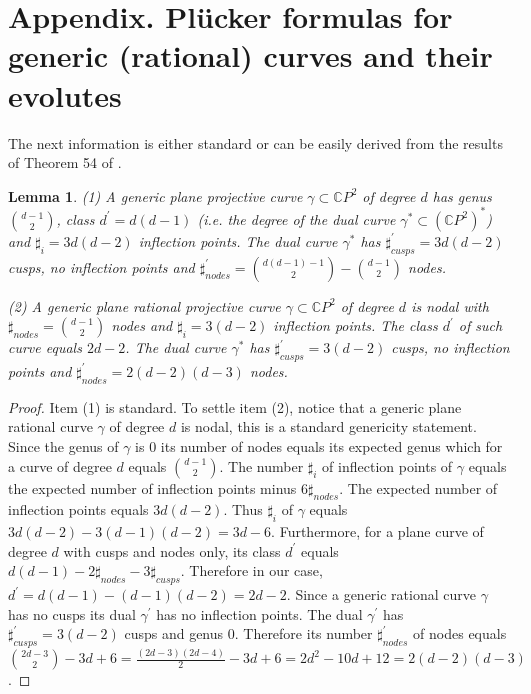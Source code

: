 \documentclass[reqno]{amsart}
\newtheorem{lemma}[theorem]{Lemma}
\newcommand{\bC}{\mathbb{C}}
\newcommand {\ga}{\gamma}
\theoremstyle{definition}
\theoremstyle{remark}
\theoremstyle{definition}
\theoremstyle{definition}
\theoremstyle{definition}
\begin{document}
\section{Appendix. Pl\"ucker formulas for generic (rational) curves and their evolutes}

The next information is either standard or can be easily derived from the results of Theorem 54 of  \cite{Coo}.

\begin{lemma}\label{lm:rat}  {\rm (1)} A generic plane projective curve $\ga\subset \bC P^2$ of degree $d$ has genus $\binom {d-1}{2}$, class  $d^\prime= d(d-1)$ (i.e. the degree of the dual curve $\ga^\ast\subset (\bC P^2)^\ast$) and  $\sharp_i=3d(d-2)$ inflection points.  The dual curve $\ga^\ast$ has $\sharp^\prime_{cusps}=3d(d-2)$ cusps, no inflection points and $\sharp^\prime_{nodes}=\binom{d(d-1)-1}{2}-\binom{d-1}{2}$ nodes.

\noindent
{\rm (2)} A generic plane rational projective curve $\ga\subset \bC P^2$ of degree $d$ is nodal with $\sharp_{nodes}=\binom{d-1}{2}$ nodes and $\sharp_i=3(d-2)$ inflection points. The class $d^\prime$ of such curve  equals $2d-2$. The dual curve $\ga^\ast$ has $\sharp^\prime_{cusps}=3(d-2)$ cusps, no inflection points and $\sharp^\prime_{nodes}=2(d-2)(d-3)$ nodes.
\end{lemma}

\begin{proof} Item (1) is standard. To settle item (2), notice that a generic plane rational curve $\gamma$ of degree $d$ is nodal, this is a standard genericity statement. Since the genus of $\gamma$ is $0$ its number of nodes equals its expected genus which for a curve of degree $d$ equals $\binom {d-1}{2}$. The number $\sharp_i$ of inflection points of $\gamma$ equals the expected number of inflection points minus $6\sharp_{nodes}$. The expected number of inflection points equals $3d(d-2)$. Thus $\sharp_i$ of  $\gamma$  equals $3d(d-2)-3(d-1)(d-2)=3d-6$.
 Furthermore, for a plane curve of degree $d$ with cusps and nodes only, its class $d^\prime$ equals $d(d-1)-2\sharp_{nodes} -3\sharp_{cusps}$. Therefore in our case, $d^\prime= d(d-1)-(d-1)(d-2)=2d-2$. Since a generic rational curve $\gamma$ has no cusps its dual $\gamma^\prime$ has no inflection points. The dual $\gamma^\prime$ has $\sharp^\prime_{cusps}=3(d-2)$ cusps and genus $0$. Therefore its number $\sharp^\prime_{nodes}$  of nodes equals $\binom{2d-3}{2}-3d+6=\frac{(2d-3)(2d-4)}{2}-3d+6=2d^2-10d+12=2(d-2)(d-3)$.
 \end{proof}
\end{document}
